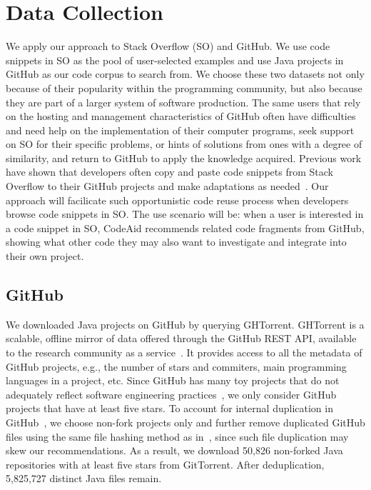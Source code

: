 \section{Data Collection}
\label{sec:dataset}
We apply our approach to Stack Overflow (SO) and GitHub. We use code snippets in SO as the pool of user-selected examples and use Java projects in GitHub as our code corpus to search from. We choose these two datasets not only because of their popularity within the programming community, but also because they are part of a larger system of software production. The same users that rely on the hosting and management characteristics of GitHub often have difficulties and need help on the implementation of their computer programs, seek support on SO for their specific problems, or hints of solutions from ones with a degree of similarity, and return to GitHub to apply the knowledge acquired. Previous work have shown that developers often copy and paste code snippets from Stack Overflow to their GitHub projects and make adaptations as needed~\cite{yang2017stack, an2017stack, wu2018developers, zhang2019analyzing}. Our approach will facilicate such opportunistic code reuse process when developers browse code snippets in SO. The use scenario will be: when a user is interested in a code snippet in SO, CodeAid recommends related code fragments from GitHub, showing what other code they may also want to investigate and integrate into their own project. 


\subsection{GitHub}
We downloaded Java projects on GitHub by querying GHTorrent. GHTorrent is a scalable, offline mirror of data offered through the GitHub REST API, available to the research community as a service~\cite{gousios2012ghtorrent}. It provides access to all the metadata of GitHub projects, e.g., the number of stars and commiters, main programming languages in a project, etc. Since GitHub has many toy projects that do not adequately reflect software engineering practices~\cite{kalliamvakou2014promises}, we only consider GitHub projects that have at least five stars. To account for internal duplication in GitHub~\cite{lopes2017dejavu}, we choose non-fork projects only and further remove duplicated GitHub files using the same file hashing method as in~\cite{lopes2017dejavu}, since such file duplication may skew our recommendations. As a result, we download 50,826 non-forked Java repositories with at least five stars from GitTorrent. After deduplication, 5,825,727 distinct Java files remain.


